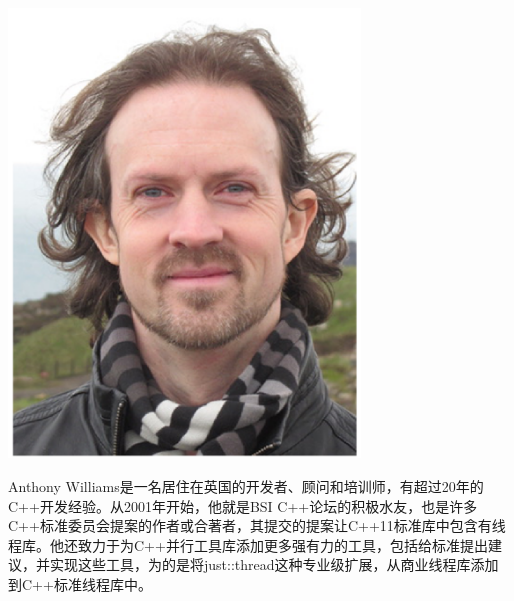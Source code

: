 \begin{center}
    \includegraphics[width=0.7\textwidth]{content/author.png}\\
\end{center}

Anthony Williams是一名居住在英国的开发者、顾问和培训师，有超过20年的C++开发经验。从2001年开始，他就是BSI C++论坛的积极水友，也是许多C++标准委员会提案的作者或合著者，其提交的提案让C++11标准库中包含有线程库。他还致力于为C++并行工具库添加更多强有力的工具，包括给标准提出建议，并实现这些工具，为的是将just::thread这种专业级扩展，从商业线程库添加到C++标准线程库中。